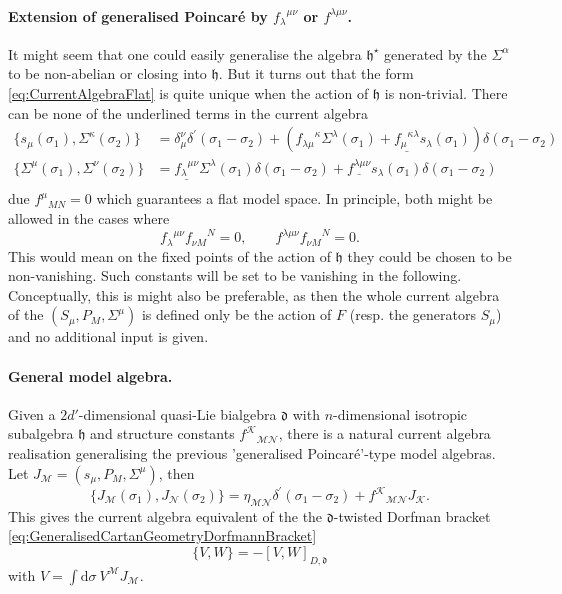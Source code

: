 \documentclass[11pt,a4paper]{article}
\numberwithin{equation}{section}
\begin{document}
\paragraph{Extension of generalised Poincar\'e by ${f_\lambda}^{\mu \nu}$ or ${f}^{\lambda \mu \nu}$.}
It might seem that one could easily generalise the algebra $\mathfrak{h}^\star$ generated by the $\Sigma^\alpha$ to be non-abelian or closing into $\mathfrak{h}$. But it turns out that the form \eqref{eq:CurrentAlgebraFlat} is quite unique when the action of $\mathfrak{h}$ is non-trivial. There can be none of the underlined terms in the current algebra
\begin{align*}
\{ s_\mu(\sigma_1), \Sigma^\kappa(\sigma_2) \}
& = \delta_\mu^\nu \delta^\prime(\sigma_1 - \sigma_2) + \left( {f_{\lambda \mu}}^\kappa \Sigma^\lambda(\sigma_1) + \underline{ {f_\mu}^{\kappa \lambda} }s_\lambda (\sigma_1) \right) \delta(\sigma_1- \sigma_2) \\
    \{ \Sigma^\mu(\sigma_1) , \Sigma^\nu(\sigma_2) \} &=  \underline{{f_\lambda}^{\mu \nu}} \Sigma^\lambda (\sigma_1)  \delta(\sigma_1- \sigma_2) +  \underline{ {f}^{\lambda \mu \nu}} s_\lambda (\sigma_1)  \delta(\sigma_1- \sigma_2)  \\
\end{align*}
due ${f^\mu}_{MN} = 0$ which guarantees a flat model space. In principle, both might be allowed in the cases where
\begin{equation}
	{f_\lambda}^{\mu \nu} {f_{\nu M}}^N = 0, \qquad f^{\lambda \mu \nu} {f_{\nu M}}^N = 0.
\end{equation}
This would mean on the fixed points of the action of $\mathfrak{h}$ they could be chosen to be non-vanishing. Such constants will be set to be vanishing in the following. Conceptually, this is might also be preferable, as then the whole current algebra of the $(S_\mu , P_M , \Sigma^\mu)$ is defined only be the action of $F$ (resp. the generators $S_\mu$) and no additional input is given.

\paragraph{General model algebra.} Given a $2d'$-dimensional quasi-Lie bialgebra $\mathfrak{d}$ with $n$-dimensional isotropic subalgebra $\mathfrak{h}$ and structure constants ${f^{\mathcal{K}}}_{\mathcal{M}\mathcal{N}}$, there is a natural current algebra realisation generalising the previous 'generalised Poincar\'e'-type model algebras. Let $J_{\mathcal{M}} = (s_\mu , P_M , \Sigma^\mu)$, then 
\begin{equation}
	\{ J_{\mathcal{M}} (\sigma_1) , J_{\mathcal{N}} (\sigma_2) \}= \eta_{\mathcal{MN}} \delta^\prime(\sigma_1 - \sigma_2) + {f^{\mathcal{K}}}_{\mathcal{M}\mathcal{N}} J_{\mathcal{K}}. \label{eq:GeneralisedCartanCurrentAlgebraFlatGeneral}
\end{equation}
This gives the current algebra equivalent of the the $\mathfrak{d}$-twisted Dorfman bracket \eqref{eq:GeneralisedCartanGeometryDorfmannBracket}
\begin{equation}
	\{V , W\} = - [V,W]_{D,\mathfrak{d}}
\end{equation}
with $V = \int \mathrm{d} \sigma \ V^{\mathcal{M}} J_{\mathcal{M}}$.
\end{document}
